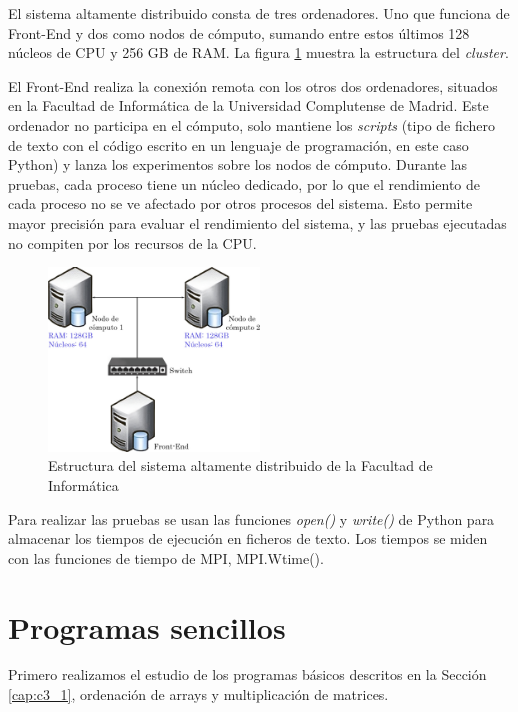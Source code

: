El sistema altamente distribuido consta de tres ordenadores. Uno que funciona de Front-End y dos como nodos de cómputo, sumando entre estos últimos 128 núcleos de CPU y 256 GB de RAM. La figura \ref{fig:cluster} muestra la estructura del \textit{cluster}.




El Front-End realiza la conexión remota con los otros dos ordenadores, situados en la Facultad de Informática de la Universidad Complutense de Madrid. Este ordenador no participa en el cómputo, solo mantiene los \textit{scripts} (tipo de fichero de texto con el código escrito en un lenguaje de programación, en este caso Python) y lanza los experimentos sobre los nodos de cómputo.  Durante las pruebas, cada proceso tiene un núcleo dedicado, por lo que el rendimiento de cada proceso no se ve afectado por otros procesos del sistema. Esto permite mayor precisión para evaluar el rendimiento del sistema, y las pruebas ejecutadas no compiten por los recursos de la CPU. 


\vspace*{0.2cm}

\begin{figure}[!h]
	\centering
	\includegraphics[width=0.5\textwidth]{images/chapter_4/cluster}
	\caption{Estructura del sistema altamente distribuido de la Facultad de Informática}
	\label{fig:cluster}
\end{figure}


Para realizar las pruebas se usan las funciones \textit{open()} y \textit{write()} de Python para almacenar los tiempos de ejecución en ficheros de texto. Los tiempos se miden con las funciones de
tiempo de MPI, MPI.Wtime().

\section{Programas sencillos}

Primero realizamos el estudio de los programas básicos descritos en la Sección \ref{cap:c3_1}, ordenación de arrays y multiplicación de matrices.

